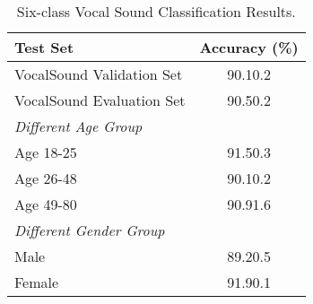 \documentclass{article}
\newcommand{\squeezeup}{\vspace{-1.6mm}}
\begin{document}
\begin{table}[]
\centering
\small
\begin{tabular}{@{}lc@{}}
\toprule
Test Set                                      & Accuracy (\%)                    \\ \midrule
VocalSound Validation Set                     & 90.10.2                       \\
VocalSound Evaluation Set                     & 90.50.2                       \\ \midrule
\multicolumn{2}{l}{\textit{Different Age Group}}    \\ \midrule
Age 18-25                                     & 91.50.3                       \\
Age 26-48                                     & 90.10.2                       \\
Age 49-80                                     & 90.91.6                       \\ \midrule
\multicolumn{2}{l}{\textit{Different Gender Group}} \\ \midrule
Male                                          & 89.20.5                       \\
Female                                        & 91.90.1                       \\ \bottomrule
\end{tabular}
\caption{Six-class Vocal Sound Classification Results.}
\label{tab:exp1}
\squeezeup\squeezeup
\end{table}
\end{document}
